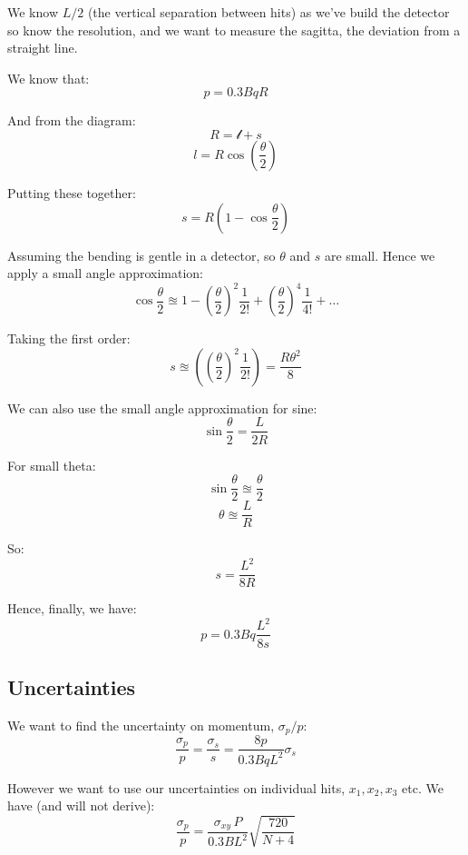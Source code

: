 We know $L/2$ (the vertical separation between hits) as we've build the detector so know the resolution, and we want to measure the sagitta, the deviation from a straight line.

We know that:
\[
    p = 0.3BqR
\]

And from the diagram:
\[
    R = \mathcal{l} + s
\]
\[
    l = R \cos \left(\frac{\theta}{2}\right)
\]

Putting these together:
\[
    s = R \left(1 - \cos \frac{\theta}{2}\right)
\]

Assuming the bending is gentle in a detector, so $\theta$ and $s$ are small. Hence we apply a small angle approximation:
\[
    \cos \frac{\theta}{2} \approxeq 1 - \left(\frac{\theta}{2}\right)^2 \frac{1}{2!} + \left(\frac{\theta}{2}\right)^4 \frac{1}{4!} + \dots
\]

Taking the first order:
\[
    s \approxeq \left(\left(\frac{\theta}{2}\right)^2 \frac{1}{2!}\right) = \frac{R \theta^2}{8}
\]

We can also use the small angle approximation for sine:
\[
    \sin \frac{\theta}{2} = \frac{L}{2R}
\]

For small theta:
\[
    \sin \frac{\theta}{2} \approxeq \frac{\theta}{2}
\]
\[
    \theta \approxeq \frac{L}{R}
\]

So:
\[
    s = \frac{L^2}{8R}
\]

Hence, finally, we have:
\[
    p = 0.3 Bq \frac{L^2}{8s}
\]

\subsection{Uncertainties}
We want to find the uncertainty on momentum, $\sigma_p / p$:
\[
    \frac{\sigma_p}{p} = \frac{\sigma_s}{s} = \frac{8p}{0.3BqL^2} \sigma_s
\]

However we want to use our uncertainties on individual hits, $x_1, x_2, x_3$ etc. We have (and will not derive):
\[
    \frac{\sigma_p}{p} = \frac{\sigma_{xy} \, P}{0.3 BL^2} \sqrt{\frac{720}{N+4}}
\]



